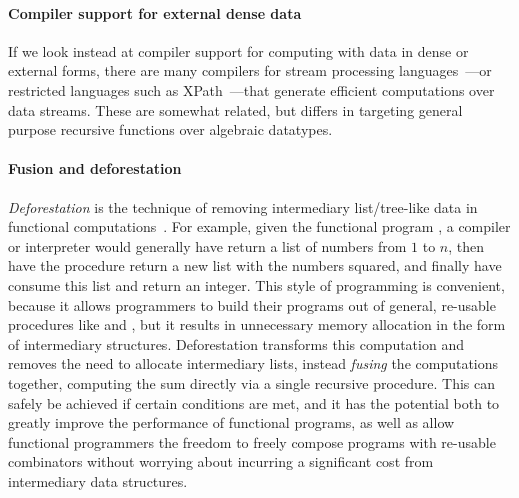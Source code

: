 \paragraph{Compiler support for external dense data}

If we look instead at compiler support for computing with data in dense or
external forms, there are many compilers for stream processing
languages~\cite{streamit,wavescript-nsdi}---or restricted languages such as
XPath~\cite{xpath-streams}---that generate efficient computations over data
streams.
%
These are somewhat related, but \ourcalc{} differs in targeting general
purpose recursive functions over algebraic datatypes.


%

\paragraph{Fusion and deforestation}

\emph{Deforestation} is the technique of removing intermediary list/tree-like
data in functional computations~\cite{wadler-deforestation}.
%
For example, given the functional program , a
compiler or interpreter would generally have  return a list of
numbers from $1$ to $n$, then have the  procedure return a new list with
the numbers squared, and finally have  consume this list and return an
integer. This style of programming is convenient, because it allows programmers
to build their programs out of general, re-usable procedures like  and
, but it results in unnecessary memory allocation in the form of
intermediary structures. Deforestation transforms this computation and removes
the need to allocate intermediary lists, instead \emph{fusing} the computations
together, computing the sum directly via a single recursive procedure. This can
safely be achieved if certain conditions are met, and it has the potential both
to greatly improve the performance of functional programs, as well as allow
functional programmers the freedom to freely compose programs with re-usable
combinators without worrying about incurring a significant cost from
intermediary data structures.

